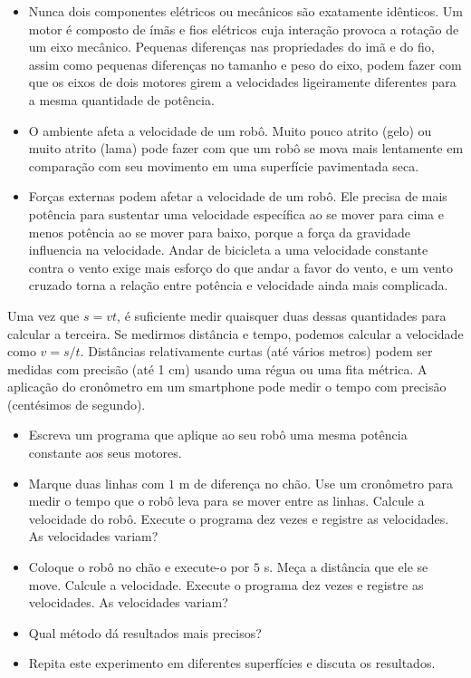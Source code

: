 \begin{itemize}
\item Nunca dois componentes elétricos ou mecânicos são exatamente idênticos. Um motor é composto de ímãs e fios elétricos cuja interação provoca a rotação de um eixo mecânico. Pequenas diferenças nas propriedades do imã e do fio, assim como pequenas diferenças no tamanho e peso do eixo, podem fazer com que os eixos de dois motores girem a velocidades ligeiramente diferentes para a mesma quantidade de potência.

\item O ambiente afeta a velocidade de um robô. Muito pouco atrito (gelo) ou muito atrito (lama) pode fazer com que um robô se mova mais lentamente em comparação com seu movimento em uma superfície pavimentada seca.

\item Forças externas podem afetar a velocidade de um robô. Ele precisa de mais potência para sustentar uma velocidade específica ao se mover para cima e menos potência ao se mover para baixo, porque a força da gravidade influencia na velocidade. Andar de bicicleta a uma velocidade constante contra o vento exige mais esforço do que andar a favor do vento, e um vento cruzado torna a relação entre potência e velocidade ainda mais complicada.
\end{itemize}

Uma vez que $s=vt$, é suficiente medir quaisquer duas dessas quantidades para calcular a terceira. Se medirmos distância e tempo, podemos calcular a velocidade como $v=s/t$. Distâncias relativamente curtas (até vários metros) podem ser medidas com precisão (até 1 cm) usando uma régua ou uma fita métrica. A aplicação do cronômetro em um smartphone pode medir o tempo com precisão (centésimos de segundo).

\begin{framed}
\begin{itemize}
\item Escreva um programa que aplique ao seu robô uma mesma potência constante aos seus motores.
\item Marque duas linhas com $1$ m de diferença no chão. Use um cronômetro para medir o tempo que o robô leva para se mover entre as linhas. Calcule a velocidade do robô. Execute o programa dez vezes e registre as velocidades. As velocidades variam?
\item Coloque o robô no chão e execute-o por $5$ s. Meça a distância que ele se move. Calcule a velocidade. Execute o programa dez vezes e registre as velocidades. As velocidades variam?
\item Qual método dá resultados mais precisos?
\item Repita este experimento em diferentes superfícies e discuta os resultados.
\end{itemize}
\end{framed}

